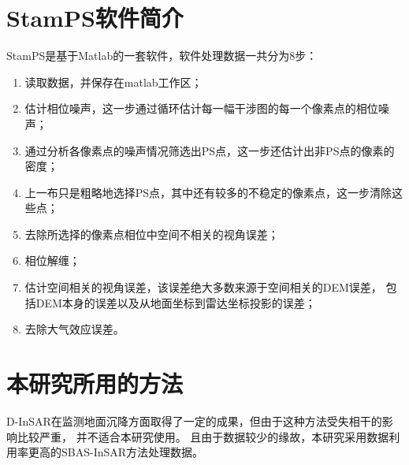\section{StamPS软件简介}
StamPS是基于Matlab的一套软件，软件处理数据一共分为8步：
\begin{enumerate}
    \item 读取数据，并保存在matlab工作区；
    \item 估计相位噪声，这一步通过循环估计每一幅干涉图的每一个像素点的相位噪声；
    \item 通过分析各像素点的噪声情况筛选出PS点，这一步还估计出非PS点的像素的密度；
    \item 上一布只是粗略地选择PS点，其中还有较多的不稳定的像素点，这一步清除这些点；
    \item 去除所选择的像素点相位中空间不相关的视角误差；
    \item 相位解缠；
    \item 估计空间相关的视角误差，该误差绝大多数来源于空间相关的DEM误差，
    包括DEM本身的误差以及从地面坐标到雷达坐标投影的误差；
    \item 去除大气效应误差。
\end{enumerate}

\section{本研究所用的方法}
D-InSAR在监测地面沉降方面取得了一定的成果，但由于这种方法受失相干的影响比较严重，
并不适合本研究使用。
且由于数据较少的缘故，本研究采用数据利用率更高的SBAS-InSAR方法处理数据。
